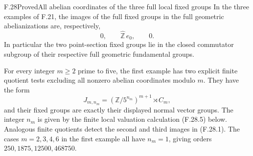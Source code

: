 \begin{statement}{F.28}{Proved}{All abelian coordinates of the three full local fixed groups}
In the three examples of F.21, the images of the full
fixed groups in the full geometric abelianizations are,
respectively,
\[
 0,\qquad \widehat{\mathbb Z}\,e_0,\qquad 0.                 \tag{F.28.1}
\]
In particular the two point-section fixed groups lie in
the closed commutator subgroup of their respective full
geometric fundamental groups.

For every integer $m\ge2$ prime to five, the first
example has two explicit finite quotient tests excluding
all nonzero abelian coordinates modulo $m$.
They have the form
\[
 J_{m,n_m}=(\mathbb Z/5^{n_m})^{m+1}\rtimes C_m,
                                                               \tag{F.28.2}
\]
and their fixed groups are exactly their displayed
normal vector groups.  The integer $n_m$ is given by
the finite local valuation calculation (F.28.5) below.
Analogous finite quotients detect the second and third
images in (F.28.1).  The cases $m=2,3,4,6$ in the
first example all have $n_m=1$, giving orders
$250,1875,12500,468750$.
\end{statement}
